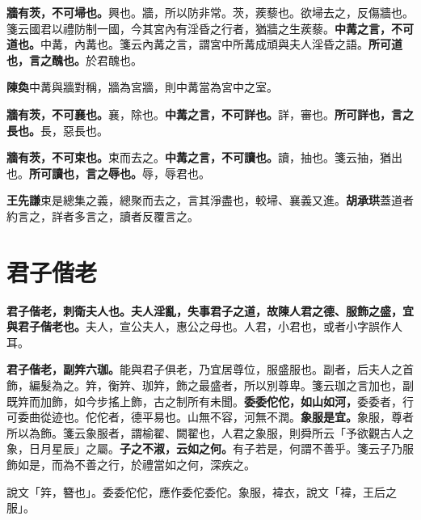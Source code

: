 \textbf{牆有茨，不可埽也。}{\footnotesize 興也。牆，所以防非常。茨，蒺藜也。欲埽去之，反傷牆也。箋云國君以禮防制一國，今其宮內有淫昏之行者，猶牆之生蒺藜。}\textbf{中冓之言，不可道也。}{\footnotesize 中冓，內冓也。箋云內冓之言，謂宮中所冓成頑與夫人淫昏之語。}\textbf{所可道也，言之醜也。}{\footnotesize 於君醜也。}

\begin{quoting}\textbf{陳奐}中冓與牆對稱，牆為宮牆，則中冓當為宮中之室。\end{quoting}

\textbf{牆有茨，不可襄也。}{\footnotesize 襄，除也。}\textbf{中冓之言，不可詳也。}{\footnotesize 詳，審也。}\textbf{所可詳也，言之長也。}{\footnotesize 長，惡長也。}

\textbf{牆有茨，不可束也。}{\footnotesize 束而去之。}\textbf{中冓之言，不可讀也。}{\footnotesize 讀，抽也。箋云抽，猶出也。}\textbf{所可讀也，言之辱也。}{\footnotesize 辱，辱君也。}

\begin{quoting}\textbf{王先謙}束是總集之義，總聚而去之，言其淨盡也，較埽、襄義又進。\textbf{胡承珙}蓋道者約言之，詳者多言之，讀者反覆言之。\end{quoting}

\section{君子偕老}


\textbf{君子偕老，刺衛夫人也。夫人淫亂，失事君子之道，故陳人君之德、服飾之盛，宜與君子偕老也。}{\footnotesize 夫人，宣公夫人，惠公之母也。人君，小君也，或者小字誤作人耳。}

\textbf{君子偕老，副筓六珈。}{\footnotesize 能與君子俱老，乃宜居尊位，服盛服也。副者，后夫人之首飾，編髮為之。筓，衡筓、珈筓，飾之最盛者，所以別尊卑。箋云珈之言加也，副既筓而加飾，如今步搖上飾，古之制所有未聞。}\textbf{委委佗佗，如山如河，}{\footnotesize 委委者，行可委曲從迹也。佗佗者，德平易也。山無不容，河無不潤。}\textbf{象服是宜。}{\footnotesize 象服，尊者所以為飾。箋云象服者，謂榆翟、闕翟也，人君之象服，則舜所云「予欲觀古人之象，日月星辰」之屬。}\textbf{子之不淑，云如之何。}{\footnotesize 有子若是，何謂不善乎。箋云子乃服飾如是，而為不善之行，於禮當如之何，深疾之。}

\begin{quoting}說文「筓，簪也」。委委佗佗，應作委佗委佗。象服，褘衣，說文「褘，王后之服」。\end{quoting}

